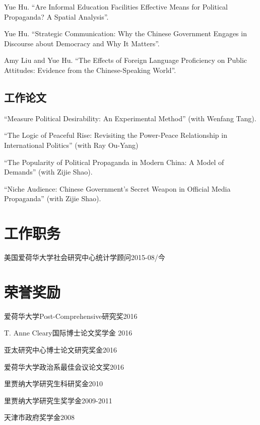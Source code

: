 \documentclass[10.5pt,]{article}
\providecommand{\tightlist}{%
	\setlength{\itemsep}{0pt}\setlength{\parskip}{0pt}}
\renewenvironment{itemize}{
	\begin{list}{}{
			\setlength{\leftmargin}{1.5em}
		}
	}{
	\end{list}
}
\begin{document}
Yue Hu. ``Are Informal Education Facilities Effective Means for
Political Propaganda? A Spatial Analysis''.

Yue Hu. ``Strategic Communication: Why the Chinese Government Engages in
Discourse about Democracy and Why It Matters''.

Amy Liu and Yue Hu. ``The Effects of Foreign Language Proficiency on
Public Attitudes: Evidence from the Chinese-Speaking World''.

\subsection{工作论文}

``Measure Political Desirability: An Experimental Method'' (with Wenfang
Tang).

``The Logic of Peaceful Rise: Revisiting the Power-Peace Relationship in
International Politics'' (with Ray Ou-Yang)

``The Popularity of Political Propaganda in Modern China: A Model of
Demands'' (with Zijie Shao).

``Niche Audience: Chinese Government's Secret Weapon in Official Media
Propaganda'' (with Zijie Shao).

\section{工作职务}

\begin{itemize}
\tightlist
\item
  美国爱荷华大学社会研究中心统计学顾问\hfill 2015-08/今
\end{itemize}

\section{荣誉奖励}

\begin{itemize}
\tightlist
\item
  爱荷华大学Post-Comprehensive研究奖\hfill 2016
\item
  T. Anne Cleary国际博士论文奖学金 \hfill 2016
\item
  亚太研究中心博士论文研究奖金\hfill 2016
\item
  爱荷华大学政治系最佳会议论文奖\hfill 2016
\item
  里贾纳大学研究生科研奖金\hfill 2010
\item
  里贾纳大学研究生奖学金\hfill 2009-2011
\item
  天津市政府奖学金\hfill 2008
\end{itemize}
\end{document}
